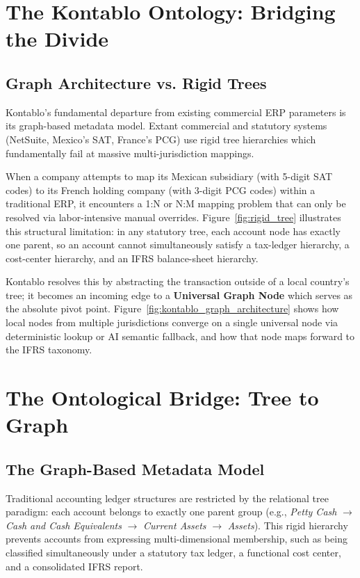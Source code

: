 \section{The Kontablo Ontology: Bridging the Divide}

\subsection{Graph Architecture vs. Rigid Trees}
Kontablo's fundamental departure from existing commercial ERP parameters is its graph-based metadata model. Extant commercial and statutory systems (NetSuite, Mexico's SAT, France's PCG) use rigid tree hierarchies which fundamentally fail at massive multi-jurisdiction mappings.

When a company attempts to map its Mexican subsidiary (with 5-digit SAT codes) to its French holding company (with 3-digit PCG codes) within a traditional ERP, it encounters a 1:N or N:M mapping problem that can only be resolved via labor-intensive manual overrides. Figure~\ref{fig:rigid_tree} illustrates this structural limitation: in any statutory tree, each account node has exactly one parent, so an account cannot simultaneously satisfy a tax-ledger hierarchy, a cost-center hierarchy, and an IFRS balance-sheet hierarchy.



Kontablo resolves this by abstracting the transaction outside of a local country's tree; it becomes an incoming edge to a \textbf{Universal Graph Node} which serves as the absolute pivot point. Figure~\ref{fig:kontablo_graph_architecture} shows how local nodes from multiple jurisdictions converge on a single universal node via deterministic lookup or AI semantic fallback, and how that node maps forward to the IFRS taxonomy.



\section{The Ontological Bridge: Tree to Graph}
\label{sec:ontology-bridge}

\subsection{The Graph-Based Metadata Model}
Traditional accounting ledger structures are restricted by the relational tree paradigm: each account belongs to exactly one parent group (e.g., \textit{Petty Cash} $\rightarrow$ \textit{Cash and Cash Equivalents} $\rightarrow$ \textit{Current Assets} $\rightarrow$ \textit{Assets}). This rigid hierarchy prevents accounts from expressing multi-dimensional membership, such as being classified simultaneously under a statutory tax ledger, a functional cost center, and a consolidated IFRS report.

